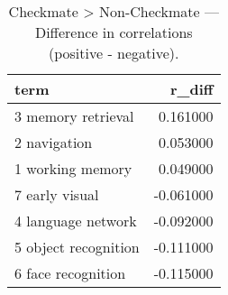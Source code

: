 \begin{table}
\caption{Checkmate > Non-Checkmate — Difference in correlations (positive - negative).}
\label{tab:Checkmate > Non-Checkmate_diff}
\begin{tabular}{lr}
\toprule
term & r\_diff \\
\midrule
3 memory retrieval & 0.161000 \\
2 navigation & 0.053000 \\
1 working memory & 0.049000 \\
7 early visual & -0.061000 \\
4 language network & -0.092000 \\
5 object recognition & -0.111000 \\
6 face recognition & -0.115000 \\
\bottomrule
\end{tabular}
\end{table}
